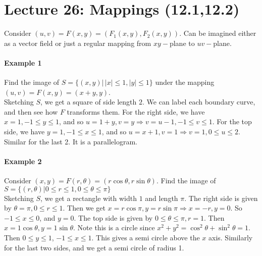 \documentclass[tikz,10pt,letter]{article}
\theoremstyle{plain}
\theoremstyle{definition}
\begin{document}
\section*{Lecture 26: Mappings (12.1,12.2)}
Consider $(u,v)=F(x,y)=(F_1(x,y),F_2(x,y))$. Can be imagined either as a vector field or just a regular mapping from $xy-$plane to $uv-$plane. 
\paragraph{Example 1}
Find the image of $S=\lbrace(x,y)|\,|x|\leq1,|y|\leq1\rbrace$ under the mapping $(u,v)=F(x,y)=(x+y,y)$. \\ 
Sketching $S$, we get a square of side length $2$. We can label each boundary curve, and then see how $F$ transforms them. For the right side, we have $x=1,-1\leq y\leq1$, and so $u=1+y,v=y\Rightarrow v=u-1,-1\leq v\leq1$. For the top side, we have $y=1,-1\leq x\leq1$, and so $u=x+1,v=1\Rightarrow v=1,0\leq u\leq2$. Similar for the last 2. It is a parallelogram. 

\paragraph{Example 2}
Consider $(x,y)=F(r,\theta)=(r\cos\theta,r\sin\theta)$. Find the image of $S=\lbrace(r,\theta)|0\leq r\leq1,0\leq\theta\leq\pi\rbrace$\\ 
Sketching $S$, we get a rectangle with width $1$ and length $\pi$. The right side is given by $\theta=\pi,0\leq r\leq1$. Then we get $x=r\cos\pi,y=r\sin\pi\Rightarrow x=-r,y=0$. So $-1\leq x\leq0$, and $y=0$. The top side is given by $0\leq\theta\leq\pi, r=1$. Then $x=1\cos\theta,y=1\sin\theta$. Note this is a circle since $x^2+y^2=\cos^2\theta+\sin^2\theta=1$. Then $0\leq y\leq1$, $-1\leq x\leq 1$. This gives a semi circle above the $x$ axis. Similarly for the last two sides, and we get a semi circle of radius 1.
\end{document}
